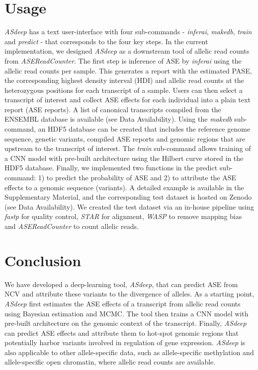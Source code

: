 \documentclass{book}
\begin{document}
\begin{refsection}
\section*{Usage}
\textit{ASdeep} has a text user-interface with four sub-commands - \textit{inferai}, \textit{makedb}, \textit{train} and \textit{predict} - that corresponds to the four key steps.
In the current implementation, we designed \textit{ASdeep} as a downstream tool of allelic read counts from \textit{ASEReadCounter}.
The first step is inference of ASE by \textit{inferai} using the allelic read counts per sample.
This generates a report with the estimated PASE, the corresponding highest density interval (HDI) and allelic read counts at the heterozygous positions for each transcript of a sample.
Users can then select a transcript of interest and collect ASE effects for each individual into a plain text report (ASE reports).
A list of canonical transcripts compiled from the ENSEMBL database \cite{Howe2020Ensembl} is available (see Data Availability).
Using the \textit{makedb} sub-command, an HDF5 database can be created that includes the reference genome sequence, genetic variants, compiled ASE reports and genomic regions that are upstream to the transcript of interest. 
The \textit{train} sub-command allows training of a CNN model with pre-built architecture using the Hilbert curve stored in the HDF5 database.
Finally, we implemented two functions in the predict sub-command: 1) to predict the probability of ASE and 2) to attribute the ASE effects to a genomic sequence (variants).
A detailed example is available in the Supplementary Material, and the corresponding test dataset is hosted on Zenodo (see Data Availability).
We created the test dataset via an in-house pipeline using \textit{fastp} \cite{Chen2018fastp} for quality control, \textit{STAR} \cite{Dobin2012STAR} for alignment, \textit{WASP} \cite{Hoek2021WASP} to remove mapping bias and \textit{ASEReadCounter} \cite{Castel2015Tools} to count allelic reads.

\section*{Conclusion}
We have developed a deep-learning tool, \textit{ASdeep}, that can predict ASE from NCV and attribute these variants to the divergence of alleles.
As a starting point, \textit{ASdeep} first estimates the ASE effects of a transcript from allelic read counts using Bayesian estimation and MCMC.
The tool then trains a CNN model with pre-built architecture on the genomic context of the transcript.
Finally, \textit{ASdeep} can predict ASE effects and attribute them to hot-spot genomic regions that potentially harbor variants involved in regulation of gene expression.
\textit{ASdeep} is also applicable to other allele-specific data, such as allele-specific methylation and allele-specific open chromatin, where allelic read counts are available.


\end{refsection}
\end{document}
